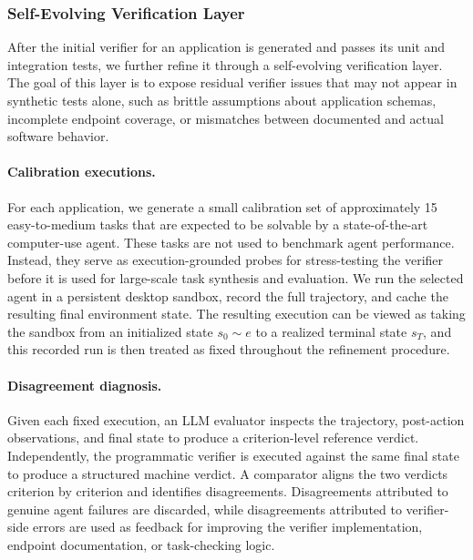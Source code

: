 \documentclass{llmxive}
\begin{document}
\subsubsection{Self-Evolving Verification Layer}
\label{sec:self-evolving-verification}
After the initial verifier for an application is generated and passes its
unit and integration tests, we further refine it through a
self-evolving verification layer. The goal of this layer is to expose
residual verifier issues that may not appear in synthetic tests alone, such
as brittle assumptions about application schemas, incomplete endpoint
coverage, or mismatches between documented and actual software behavior.

\paragraph{Calibration executions.} For each application, we generate a small calibration set of approximately
15 easy-to-medium tasks that are expected to be solvable by a
state-of-the-art computer-use agent. These tasks are not used to benchmark
agent performance. Instead, they serve as execution-grounded probes for
stress-testing the verifier before it is used for large-scale task synthesis
and evaluation. We run the selected agent in a persistent desktop sandbox,
record the full trajectory, and cache the resulting final environment state.
The resulting execution can be viewed as taking the sandbox from an initialized
state $s_0 \sim e$ to a realized terminal state $s_T$, and this recorded run is
then treated as fixed throughout the refinement procedure.

\paragraph{Disagreement diagnosis.} Given each fixed execution, an LLM evaluator inspects the trajectory,
post-action observations, and final state to produce a criterion-level
reference verdict. Independently, the programmatic verifier is executed
against the same final state to produce a structured machine verdict. A
comparator aligns the two verdicts criterion by criterion and identifies
disagreements. Disagreements attributed to genuine agent failures are
discarded, while disagreements attributed to verifier-side errors are used as
feedback for improving the verifier implementation, endpoint documentation,
or task-checking logic.
\end{document}
